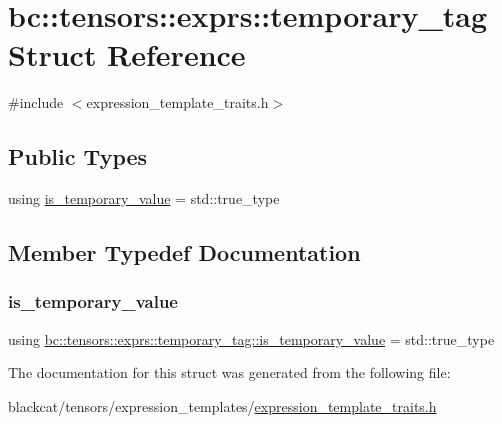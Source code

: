 \hypertarget{structbc_1_1tensors_1_1exprs_1_1temporary__tag}{}\section{bc\+:\+:tensors\+:\+:exprs\+:\+:temporary\+\_\+tag Struct Reference}
\label{structbc_1_1tensors_1_1exprs_1_1temporary__tag}


{\ttfamily \#include $<$expression\+\_\+template\+\_\+traits.\+h$>$}

\subsection*{Public Types}
\begin{DoxyCompactItemize}
\item 
using \hyperlink{structbc_1_1tensors_1_1exprs_1_1temporary__tag_ab3ff7ab35c5179019031338834bc3003}{is\+\_\+temporary\+\_\+value} = std\+::true\+\_\+type
\end{DoxyCompactItemize}


\subsection{Member Typedef Documentation}
\mbox{\label{structbc_1_1tensors_1_1exprs_1_1temporary__tag_ab3ff7ab35c5179019031338834bc3003}} 
\subsubsection{\texorpdfstring{is\+\_\+temporary\+\_\+value}{is\_temporary\_value}}
{\footnotesize\ttfamily using \hyperlink{structbc_1_1tensors_1_1exprs_1_1temporary__tag_ab3ff7ab35c5179019031338834bc3003}{bc\+::tensors\+::exprs\+::temporary\+\_\+tag\+::is\+\_\+temporary\+\_\+value} =  std\+::true\+\_\+type}



The documentation for this struct was generated from the following file\+:\begin{DoxyCompactItemize}
\item 
blackcat/tensors/expression\+\_\+templates/\hyperlink{expression__template__traits_8h}{expression\+\_\+template\+\_\+traits.\+h}\end{DoxyCompactItemize}

